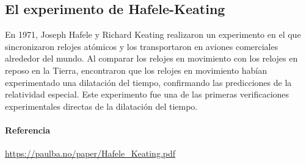 \documentclass{article}
\begin{document}

\subsection{El experimento de Hafele-Keating}
En 1971, Joseph Hafele y Richard Keating realizaron un experimento en el que sincronizaron relojes atómicos y los transportaron en aviones comerciales alrededor del mundo. Al comparar los relojes en movimiento con los relojes en reposo en la Tierra, encontraron que los relojes en movimiento habían experimentado una dilatación del tiempo, confirmando las predicciones de la relatividad especial. Este experimento fue una de las primeras verificaciones experimentales directas de la dilatación del tiempo.

\paragraph{Referencia}
\url{https://paulba.no/paper/Hafele_Keating.pdf}


\end{document}
